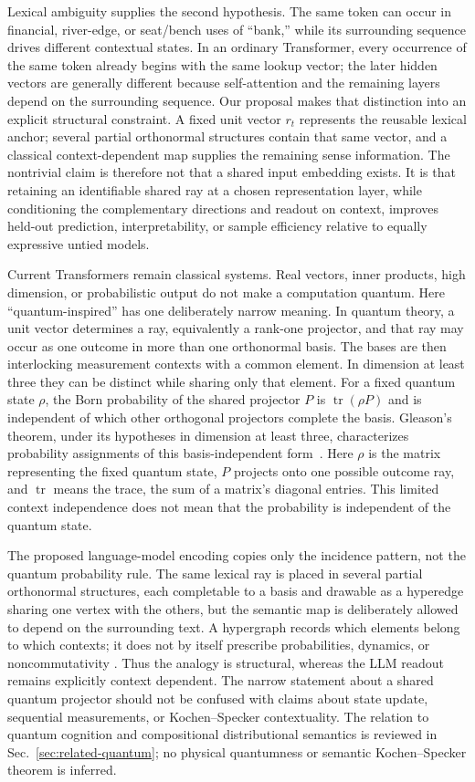 \documentclass[
  aps,
  reprint,
  superscriptaddress,
  floatfix,
  nofootinbib,
  longbibliography
]{revtex4-2}
\begin{document}
Lexical ambiguity supplies the second hypothesis.  The same token can occur in
financial, river-edge, or seat/bench uses of ``bank,'' while its surrounding
sequence drives different contextual states.  In an ordinary Transformer,
every occurrence of the same token already begins with the same lookup vector;
the later hidden vectors are generally different because self-attention and
the remaining layers depend on the surrounding sequence.  Our proposal makes
that distinction into an explicit structural constraint.  A fixed unit vector
$r_t$ represents the reusable lexical anchor; several partial orthonormal
structures contain that same vector, and a classical context-dependent map supplies the remaining
sense information.  The nontrivial claim is therefore not that a shared input
embedding exists.  It is that retaining an identifiable shared ray at a chosen
representation layer, while conditioning the complementary directions and
readout on context, improves held-out prediction, interpretability, or sample
efficiency relative to equally expressive untied models.

Current Transformers remain classical systems.  Real vectors, inner products,
high dimension, or probabilistic output do not make a computation quantum.
Here ``quantum-inspired'' has one deliberately narrow meaning.  In quantum
theory, a unit vector determines a ray, equivalently a rank-one projector, and
that ray may occur as one outcome in more than one orthonormal basis.  The
bases are then interlocking measurement contexts with a common element.  In
dimension at least three they can be distinct while sharing only that element.
For a fixed quantum state $\rho$, the Born probability of the shared projector $P$ is
$\operatorname{tr}(\rho P)$ and is independent of which other orthogonal
projectors complete the basis.  Gleason's theorem, under its hypotheses in
dimension at least three, characterizes probability assignments of this
basis-independent form~\cite{Gleason,ramanathan-2024}.  Here $\rho$ is the
matrix representing the fixed quantum state, $P$ projects onto one possible
outcome ray, and $\operatorname{tr}$ means the trace, the sum of a matrix's
diagonal entries.  This limited context independence does not mean that the
probability is independent of the quantum state.

The proposed language-model encoding copies only the incidence pattern, not
the quantum probability rule.  The same lexical ray is placed in several
partial orthonormal structures, each completable to a basis and drawable as a
hyperedge sharing one vertex with the others, but the
semantic map is deliberately allowed to depend on the surrounding text.  A
hypergraph records which elements belong to which contexts; it does not by
itself prescribe probabilities, dynamics, or noncommutativity
\cite{svozil-2021-chroma}.  Thus the analogy is structural, whereas the LLM
readout remains explicitly context dependent.  The narrow statement about a
shared quantum projector should not be confused with claims about state
update, sequential measurements, or Kochen--Specker contextuality.  The
relation to quantum cognition and compositional distributional semantics is
reviewed in Sec.~\ref{sec:related-quantum}; no physical quantumness or semantic
Kochen--Specker theorem is inferred.
\end{document}
